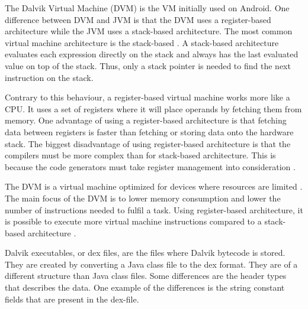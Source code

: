 
The Dalvik Virtual Machine (DVM) is the VM initially used on Android. One difference between DVM and JVM is that the DVM uses a register-based architecture while the JVM uses a stack-based architecture. The most common virtual machine architecture is the stack-based \cite[p.~158]{craig2010virtual}. A stack-based architecture evaluates each expression directly on the stack and always has the last evaluated value on top of the stack. Thus, only a stack pointer is needed to find the next instruction on the stack.

Contrary to this behaviour, a register-based virtual machine works more like a CPU. It uses a set of registers where it will place operands by fetching them from memory. One advantage of using a register-based architecture is that fetching data between registers is faster than fetching or storing data onto the hardware stack. The biggest disadvantage of using register-based architecture is that the compilers must be more complex than for stack-based architecture. This is because the code generators must take register management into consideration \cite[p.~159-160]{craig2010virtual}.

The DVM is a virtual machine optimized for devices where resources are limited \cite{android:dalvik:internals}. The main focus of the DVM is to lower memory consumption and lower the number of instructions needed to fulfil a task. Using register-based architecture, it is possible to execute more virtual machine instructions compared to a stack-based architecture \cite{shi2008virtual}. 




Dalvik executables, or dex files, are the files where Dalvik bytecode is stored. They are created by converting a Java class file to the dex format. They are of a different structure than Java class files. Some differences are the header types that describes the data. One example of the differences is the string constant fields that are present in the dex-file. %

